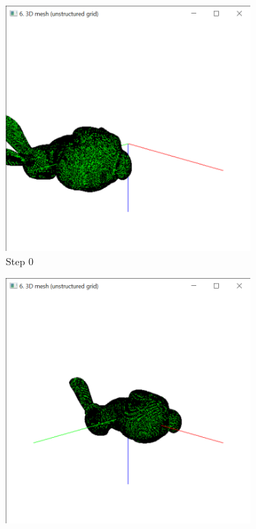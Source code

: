 \documentclass{bigdata}
\begin{document}
\begin{figure}[h!]
  \centering
  \begin{subfigure}[b]{0.4\linewidth}
    \includegraphics[width=\linewidth]{Pictures/Part2/Step0.png}
    \caption{Step 0}
  \end{subfigure}
  \begin{subfigure}[b]{0.4\linewidth}
    \includegraphics[width=\linewidth]{Pictures/Part2/step1.png}

\end{subfigure}
\end{figure}
\end{document}
